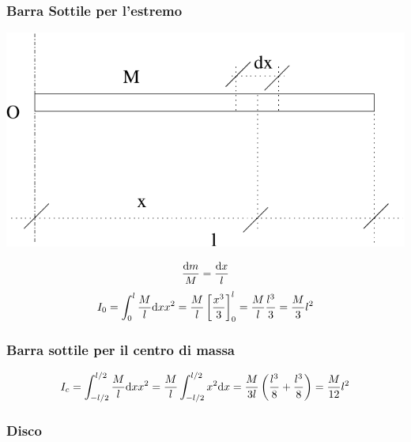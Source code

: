 \begin{minipage}[c]{\textwidth}
\subsubsection{Barra Sottile per l'estremo}

   \centering
   \includegraphics[scale=0.4]{immagini/fisica1/sbarra_sottile1}

\begin{equation*}\frac{\mathrm{d} m}{M}=\frac{\mathrm{d} x}{l}\end{equation*}
\begin{equation*}I_0=\int_0^l\frac{M}{l}\mathrm{d} x x^2=\frac{M}{l}\left[\frac{x^3}{3}\right]_0^l=\frac{M}{l}\frac{l^3}{3}=\frac{M}{3}l^2\end{equation*}
\end{minipage}

\subsubsection{Barra sottile per il centro di massa}
$$I_c=\int_{-l/2}^{l/2}\frac{M}{l}\mathrm{d} x
x^2=\frac{M}{l}\int_{-l/2}^{l/2}x^2 \mathrm{d}
x=\frac{M}{3l}\left(\frac{l^3}{8}+\frac{l^3}{8}\right)=\frac{M}{12}l^2$$

\subsubsection{Disco}


